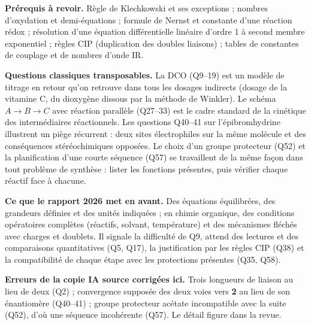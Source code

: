 \documentclass[11pt,a4paper]{article}
\begin{document}
\textbf{Prérequis à revoir.} Règle de Klechkowski et ses exceptions ; nombres d'oxydation et demi-équations ; formule de Nernst et constante d'une réaction rédox ; résolution d'une équation différentielle linéaire d'ordre 1 à second membre exponentiel ; règles CIP (duplication des doubles liaisons) ; tables de constantes de couplage et de nombres d'onde IR.

\textbf{Questions classiques transposables.} La DCO (Q9--19) est un modèle de titrage en retour qu'on retrouve dans tous les dosages indirects (dosage de la vitamine C, du dioxygène dissous par la méthode de Winkler). Le schéma \(A\to B\to C\) avec réaction parallèle (Q27--33) est le cadre standard de la cinétique des intermédiaires réactionnels. Les questions Q40--41 sur l'épibromhydrine illustrent un piège récurrent : deux sites électrophiles sur la même molécule et des conséquences stéréochimiques opposées. Le choix d'un groupe protecteur (Q52) et la planification d'une courte séquence (Q57) se travaillent de la même façon dans tout problème de synthèse : lister les fonctions présentes, puis vérifier chaque réactif face à chacune.

\textbf{Ce que le rapport 2026 met en avant.} Des équations équilibrées, des grandeurs définies et des unités indiquées ; en chimie organique, des conditions opératoires complètes (réactifs, solvant, température) et des mécanismes fléchés avec charges et doublets. Il signale la difficulté de Q9, attend des lectures et des comparaisons quantitatives (Q5, Q17), la justification par les règles CIP (Q38) et la compatibilité de chaque étape avec les protections présentes (Q35, Q58).

\textbf{Erreurs de la copie IA source corrigées ici.} Trois longueurs de liaison au lieu de deux (Q2) ; convergence supposée des deux voies vers \textbf{2} au lieu de son énantiomère (Q40--41) ; groupe protecteur acétate incompatible avec la suite (Q52), d'où une séquence incohérente (Q57). Le détail figure dans la revue.
\end{document}
